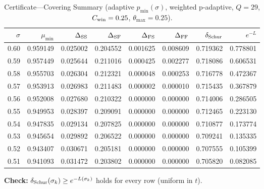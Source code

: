 \begin{table}[h!]
\centering
\caption{Certificate—Covering Summary (adaptive $p_{\min}(\sigma)$, weighted p-adaptive, $Q=29$, $C_{\rm win}=0.25$, $\theta_{\max}=0.25$).}
\label{tab:covering-certificate-adaptive}
\small
\begin{tabular}{r r r r r r r r}
\toprule
$\sigma$ & $\mu_{\min}$ & $\Delta_{\rm SS}$ & $\Delta_{\rm SF}$ & $\Delta_{\rm FS}$ & $\Delta_{\rm FF}$ & $\delta_{\rm Schur}$ & $e^{-L}$ \\
\midrule
0.60 & 0.959149 & 0.025002 & 0.204552 & 0.001625 & 0.008609 & 0.719362 & 0.778801 \\
0.59 & 0.957449 & 0.025644 & 0.211016 & 0.000425 & 0.002277 & 0.718086 & 0.606531 \\
0.58 & 0.955703 & 0.026304 & 0.212321 & 0.000048 & 0.000253 & 0.716778 & 0.472367 \\
0.57 & 0.953913 & 0.026983 & 0.211483 & 0.000002 & 0.000010 & 0.715435 & 0.367879 \\
0.56 & 0.952008 & 0.027680 & 0.210322 & 0.000000 & 0.000000 & 0.714006 & 0.286505 \\
0.55 & 0.949953 & 0.028397 & 0.209091 & 0.000000 & 0.000000 & 0.712465 & 0.223130 \\
0.54 & 0.947835 & 0.029134 & 0.207825 & 0.000000 & 0.000000 & 0.710877 & 0.173774 \\
0.53 & 0.945654 & 0.029892 & 0.206522 & 0.000000 & 0.000000 & 0.709241 & 0.135335 \\
0.52 & 0.943407 & 0.030671 & 0.205181 & 0.000000 & 0.000000 & 0.707555 & 0.105399 \\
0.51 & 0.941093 & 0.031472 & 0.203802 & 0.000000 & 0.000000 & 0.705820 & 0.082085 \\
\bottomrule
\end{tabular}
\vspace{3pt}
\par\noindent\textbf{Check:} $\delta_{\rm Schur}(\sigma_k)\ge e^{-L(\sigma_k)}$ holds for every row (uniform in $t$).
\end{table}
